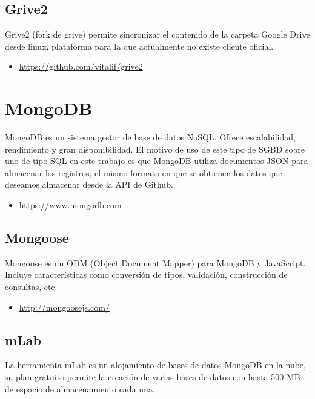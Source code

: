 \subsection{Grive2}

Grive2 (fork de grive) permite sincronizar el contenido de la carpeta Google Drive desde linux, plataforma para la que actualmente no existe cliente oficial.

\begin{itemize}
	\item \url{https://github.com/vitalif/grive2}
\end{itemize}

\section{MongoDB}

MongoDB es un sistema gestor de base de datos NoSQL. Ofrece escalabilidad, rendimiento y gran disponibilidad. El motivo de uso de este tipo de SGBD sobre uno de tipo SQL en este trabajo es que MongoDB utiliza documentos JSON para almacenar los registros, el mismo formato en que se obtienen los datos que deseamos almacenar desde la API de Github.

\begin{itemize}
	\item \url{https://www.mongodb.com}
\end{itemize}

\subsection{Mongoose}

Mongoose es un ODM (Object Document Mapper) para MongoDB y JavaScript. Incluye características como conversión de tipos, validación, construcción de consultas, etc.

\begin{itemize}
	\item \url{http://mongoosejs.com/}
\end{itemize}

\subsection{mLab}

La herramienta mLab es un alojamiento de bases de datos MongoDB en la nube, su plan gratuito permite la creación de varias bases de datos con hasta 500 MB de espacio de almacenamiento cada una.


